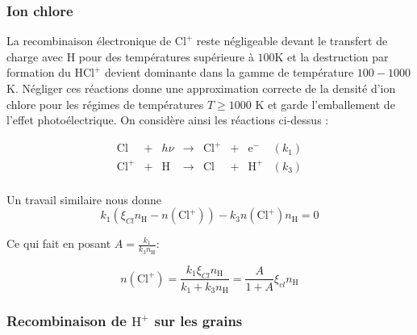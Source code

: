 

\subsubsection{Ion chlore}

La recombinaison électronique de $\mathrm{Cl}^+$ reste négligeable devant le transfert de charge avec $\mathrm{H}$ pour des températures supérieure à $100$K et la destruction par formation du $\mathrm{HCl}^+$ devient dominante dans la gamme de température $100-1000$K. Négliger ces réactions donne une approximation correcte de la densité d'ion chlore pour les régimes de températures $T\geq 1000$ K et garde l'emballement de l'effet photoélectrique. On considère ainsi les réactions ci-dessus :


\begin{equation}
    \begin{array}{lccccclr}
       \mathrm{Cl}  & + & h\nu & \rightarrow & \mathrm{Cl}^+ & + & \mathrm{e}^- & (k_1) \\
        \mathrm{Cl}^+ & + &\mathrm{H}   & \rightarrow &\mathrm{Cl}  & + & \mathrm{H}^+ & (k_3) \\
    \end{array}
\end{equation}

Un travail similaire nous donne 
\begin{equation}
    k_1(\xi_{Cl}n_{\mathrm{H}} - n(\mathrm{Cl}^+)) - k_3 n(\mathrm{Cl}^+) n_{\mathrm{H}} = 0
\end{equation}

Ce qui fait en posant $A = \frac{k_1}{k_3 n_{\mathrm{H}}}$:

\begin{equation}
\boxed{n(\mathrm{Cl}^+) = \frac{k_1 \xi_{Cl} n_{\mathrm{H}}}{k_1 + k_3 n_{\mathrm{H}}} = \frac{A}{1 + A} \xi_{cl} n_{\mathrm{H}}}
\end{equation}



\subsubsection{Recombinaison de $\mathrm{H}^+$ sur les grains}

